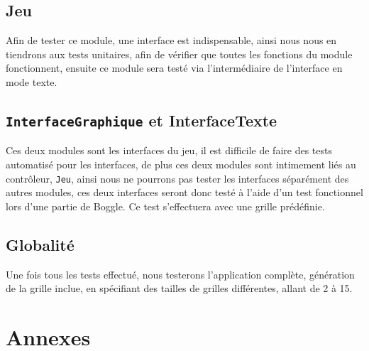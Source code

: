 \documentclass[12pt,a4paper,openany]{article}
\begin{document}
	\subsection{Jeu}
	Afin de tester ce module, une interface est indispensable, ainsi nous nous en tiendrons aux tests unitaires, afin de vérifier que toutes les fonctions du
	module fonctionnent, ensuite ce module sera testé via l'intermédiaire de l'interface en mode texte.

	\subsection{\texttt{InterfaceGraphique} et InterfaceTexte}
	Ces deux modules sont les interfaces du jeu, il est difficile de faire des tests automatisé pour les interfaces, de plus ces deux modules sont intimement
	liés au contrôleur, \texttt{Jeu}, ainsi nous ne pourrons pas tester les interfaces séparément des autres modules, ces deux interfaces seront donc testé à
	l'aide d'un test fonctionnel lors d'une partie de Boggle. Ce test s'effectuera avec une grille prédéfinie.

	\subsection{Globalité}
	Une fois tous les tests effectué, nous testerons l'application complète, génération de la grille inclue, en spécifiant des tailles de grilles différentes,
	allant de 2 à 15.

	\newpage
	\appendix
	\section{Annexes}
	\listoffigures
	\listoftables
	
\end{document}
